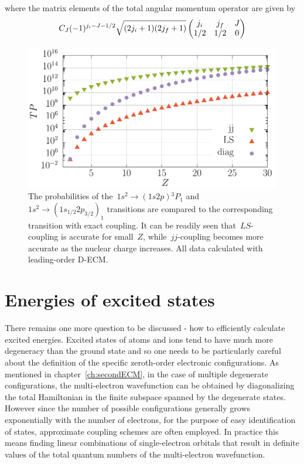  where the matrix elements of the total angular momentum operator are given by
\begin{equation}
    C_J 
    (-1)^{j_i-J-1/2}\sqrt{(2j_i+1)(2j_f+1)}\left(\begin{matrix}j_i&j_f&J\\\-1/2&1/2&0
    \end{matrix}\right)
\end{equation}

\begin{figure}
    \centering
    \includegraphics[width=130mm]{Graphs/LSvsjj.pdf}
    \caption{The probabilities of the~$1s^2 \rightarrow (1s 2p) {}^3P_1$ and~$1s^2 \rightarrow (1s_{1/2} 2p_{3/2})_1$ transitions are compared to the corresponding transition with exact coupling. It can be readily seen that~$LS$-coupling is accurate for small~$Z$, while~$jj$-coupling becomes more accurate as the nuclear charge increases. All data calculated with leading-order D-ECM.}
    \label{LSjjPlot}
\end{figure}

\section{Energies of excited states}
\label{sec:Coupling}

There remains one more question to be discussed - how to efficiently calculate excited energies. Excited states of atoms and ions tend to have much more degeneracy than the ground state and so one needs to be particularly careful about the definition of the specific zeroth-order electronic configurations. As mentioned in chapter~\ref{ch:secondECM}, in the case of multiple degenerate configurations, the multi-electron wavefunction can be obtained by diagonalizing the total Hamiltonian in the finite subspace spanned by the degenerate states. However since the number of possible configurations generally grows exponentially with the number of electrons, for the purpose of easy identification of states, approximate coupling schemes are often employed. In practice this means finding linear combinations of single-electron orbitals that result in definite values of the total quantum numbers of the multi-electron wavefunction.

